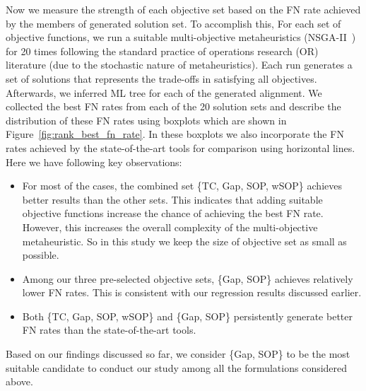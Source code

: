 Now we measure the strength of each objective set based on the FN rate achieved by the members of generated solution set. To accomplish this, For each set of objective functions, we run a suitable multi-objective metaheuristics (NSGA-II~\citep{deb2002fast}) for 20 times following the standard practice of operations research (OR) literature (due to the stochastic nature of metaheuristics). Each run generates a set of solutions that represents the trade-offs in satisfying all objectives. Afterwards, we inferred ML tree for each of the generated alignment. We collected the best FN rates from each of the 20 solution sets and describe the distribution of these FN rates using boxplots which are shown in Figure~\ref{fig:rank_best_fn_rate}. In these boxplots we also incorporate the FN rates achieved by the state-of-the-art tools for comparison using horizontal lines. Here we have following key observations:
\begin{itemize}
	\item For most of the cases, the combined set \{TC, Gap, SOP, wSOP\} achieves better results than the other sets. This indicates that adding suitable objective functions increase the chance of achieving the best FN rate. However, this increases the overall complexity of the multi-objective metaheuristic. So in this study we keep the size of objective set as small as possible.
	\item Among our three pre-selected objective sets, \{Gap, SOP\} achieves relatively lower FN rates. This is consistent with our regression results discussed earlier.
	\item Both \{TC, Gap, SOP, wSOP\} and \{Gap, SOP\} persistently generate better FN rates than the state-of-the-art tools.
\end{itemize}
Based on our findings discussed so far, we consider \{Gap, SOP\} to be the most suitable candidate to conduct our study among all the formulations considered above. %
